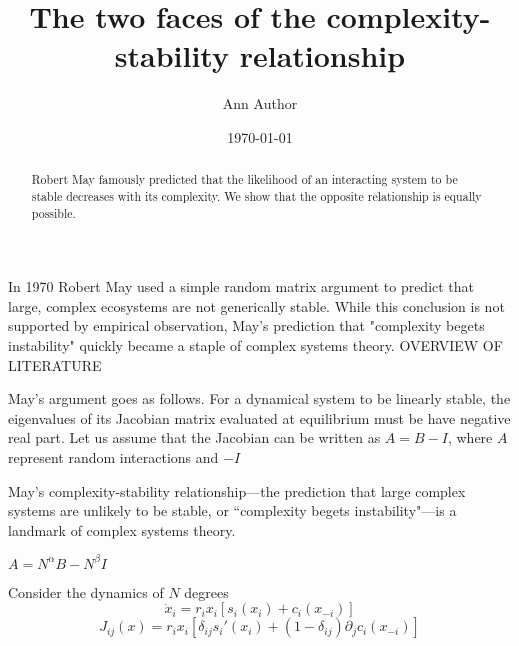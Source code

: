 \documentclass[%
 reprint,
 amsmath,amssymb,
 aps,
]{revtex4-2}
\begin{document}
\title{The two faces of the complexity-stability relationship}

\author{Ann Author}


\date{\today}%

\begin{abstract}
Robert May famously predicted that the likelihood of an interacting system to be stable decreases with its complexity. We show that the opposite relationship is equally possible.   
\end{abstract}


\maketitle

In 1970 Robert May used a simple random matrix argument to predict that large, complex ecosystems are not generically stable. While this conclusion is not supported by empirical observation, May's prediction that "complexity begets instability" quickly became a staple of complex systems theory. OVERVIEW OF LITERATURE

May's argument goes as follows. For a dynamical system to be linearly stable, the eigenvalues of its Jacobian matrix evaluated at equilibrium must be have negative real part. Let us assume that the Jacobian can be written as $A = B - I$, where $A$ represent random interactions and $-I$  

May's complexity-stability relationship---the prediction that large complex systems are unlikely to be stable, or ``complexity begets instability"---is a landmark of complex systems theory. 

$A = N^\alpha B - N^\beta I$

Consider the dynamics of $N$ degrees  
\begin{equation}
  \dot{x}_i = r_ix_i[s_i(x_i) + c_i(x_{-i})]
\end{equation}
\begin{equation}
  J_{ij}(x) = r_ix_i[\delta_{ij}  s_i'(x_i) + (1-\delta_{ij})\partial_j c_i(x_{-i})]
\end{equation}
\end{document}
